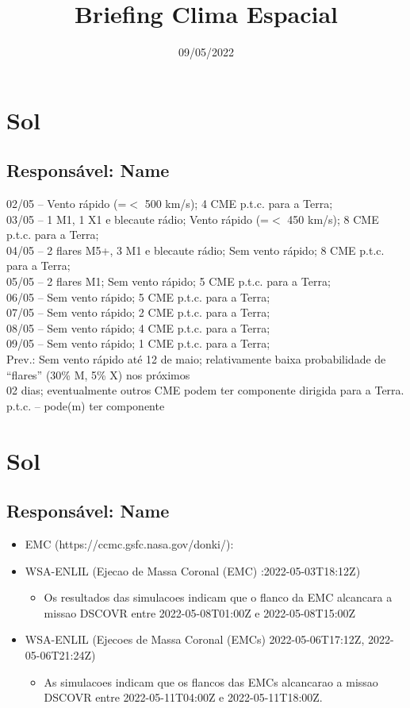 \documentclass[a4paper, 10pt]{article}
\title{\Large{\textbf{Briefing Clima Espacial}}}
\date{09/05/2022}
\begin{document}
\maketitle 

  \thispagestyle{fancy} \section{Sol} 
 \subsection{Responsável: Name}

02/05 – Vento rápido (=$<$ 500 km/s); 4 CME p.t.c. para a Terra; \\ 03/05 – 1 M1, 1 X1 e blecaute rádio; Vento rápido (=$<$ 450 km/s); 8 CME p.t.c. para a Terra; \\ 04/05 – 2 flares M5+, 3 M1 e blecaute rádio; Sem vento rápido; 8 CME p.t.c. para a Terra;  \\ 05/05 – 2 flares M1; Sem vento rápido; 5 CME p.t.c. para a Terra;  \\ 06/05 – Sem vento rápido; 5 CME p.t.c. para a Terra; \\ 07/05 – Sem vento rápido; 2 CME p.t.c. para a Terra; \\ 08/05 – Sem vento rápido; 4 CME p.t.c. para a Terra; \\ 09/05 – Sem vento rápido; 1 CME p.t.c. para a Terra; \\ Prev.: Sem vento rápido até 12 de maio; relativamente baixa probabilidade de “flares” (30\% M, 5\% X) nos próximos \\ 02 dias; eventualmente outros CME podem ter componente dirigida para a Terra. \\ p.t.c. – pode(m) ter componente\section{Sol} 
 \subsection{Responsável: Name}

\begin{itemize} 
 \item EMC (https://ccmc.gsfc.nasa.gov/donki/):
\item WSA-ENLIL (Ejecao de Massa Coronal (EMC) :2022-05-03T18:12Z)
\begin{itemize} 
 \item Os resultados das simulacoes indicam que o flanco da EMC alcancara a missao DSCOVR entre 2022-05-08T01:00Z e 2022-05-08T15:00Z
\end{itemize} 
 \item WSA-ENLIL (Ejecoes de Massa Coronal (EMCs) 2022-05-06T17:12Z, 2022-05-06T21:24Z)
\begin{itemize} 
 \item As simulacoes indicam que os flancos das EMCs alcancarao a missao DSCOVR entre 2022-05-11T04:00Z e 2022-05-11T18:00Z. 
\end{itemize} 
 \end{itemize} 
 
\end{document}

